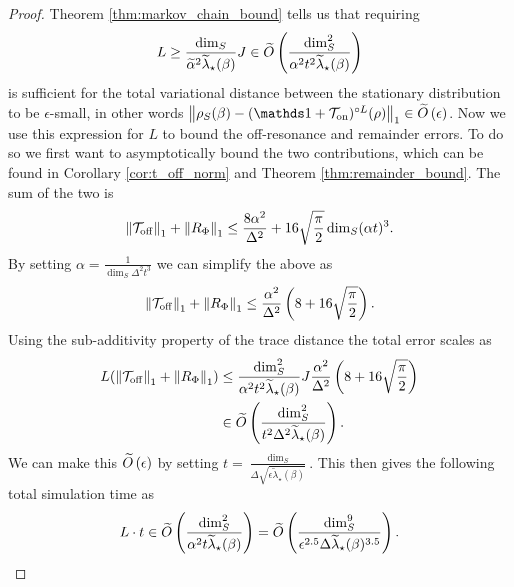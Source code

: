 \begin{proof}
    Theorem \ref{thm:markov_chain_bound} tells us that requiring
    \begin{align}
        L \ge \frac{\dim_S}{\widetilde{\alpha}^2 \widetilde{\lambda}_\star(\beta)} J \in \widetilde{O} \left( \frac{\dim_S^2}{\alpha^2 t^2 \widetilde{\lambda}_\star(\beta)} \right)
    \end{align}
    is sufficient for the total variational distance between the stationary distribution to be $\epsilon$-small, in other words $\norm{\rho_S(\beta) - (\identity + \TT_{\on})^{\circ L}(\rho)}_1 \in \bigotilde{\epsilon}$. Now we use this expression for $L$ to bound the off-resonance and remainder errors. To do so we first want to asymptotically bound the two contributions, which can be found in Corollary \ref{cor:t_off_norm} and Theorem \ref{thm:remainder_bound}. The sum of the two is
    \begin{equation}
        \norm{\mathcal{T}_{\rm off}}_1 + \norm{R_{\Phi}}_1 \le \frac{8 \alpha^2}{\Delta^2} + 16 \sqrt{\frac{\pi}{2}} \dim_S (\alpha t)^3.
    \end{equation}
    By setting $\alpha = \frac{1}{\dim_S \Delta^2 t^3}$ we can simplify the above as
    \begin{equation}
        \norm{\mathcal{T}_{\rm off}}_1 + \norm{R_{\Phi}}_1 \le \frac{\alpha^2}{\Delta^2} \left(8 + 16 \sqrt{\frac{\pi}{2}} \right).
    \end{equation}
    Using the sub-additivity property of the trace distance the total error scales as
    \begin{align}
        L (\norm{\mathcal{T}_{\rm off}}_1 + \norm{R_{\Phi}}_1) &\le \frac{\dim_S^2}{\alpha^2 t^2 \widetilde{\lambda}_\star(\beta)} J \frac{\alpha^2}{\Delta^2} \left(8 + 16 \sqrt{\frac{\pi}{2}} \right) \\
        &\in \widetilde{O} \left( \frac{\dim_S^2}{t^2 \Delta^2 \widetilde{\lambda}_\star(\beta)} \right).
    \end{align}
    We can make this $\widetilde{O} \left( \epsilon \right)$ by setting $t = \frac{\dim_S}{\Delta \sqrt{\epsilon \widetilde{\lambda}_\star(\beta)}}$.
    This then gives the following total simulation time as
    \begin{align}
        L\cdot t \in \widetilde{O} \left( \frac{\dim_S^2}{\alpha^2 t \widetilde{\lambda}_\star(\beta)}  \right) = \widetilde{O} \left( \frac{\dim_S^9}{\epsilon^{2.5} \Delta  \widetilde{\lambda}_\star(\beta)^{3.5}} \right).
    \end{align}
    

\end{proof}
